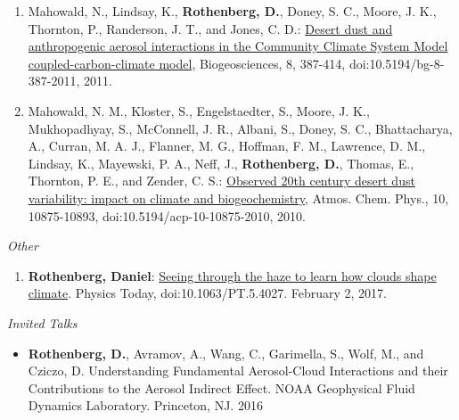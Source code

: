 \documentclass[11pt,letterpaper]{article}
\newcommand{\mhead}[1]{\leavevmode\marginpar{\sffamily\footnotesize #1}}
\begin{document}
\begin{enumerate}[itemindent=-10pt]
 \item Mahowald, N., Lindsay, K., \textbf{Rothenberg, D.}, Doney, S. C., Moore, J. K., Thornton, P., Randerson, J. T., and Jones, C. D.: \href{http://dx.doi.org/10.5194/bg-8-387-2011}{Desert dust and anthropogenic aerosol interactions in the Community Climate System Model coupled-carbon-climate model}, Biogeosciences, 8, 387-414, doi:10.5194/bg-8-387-2011, 2011.

 \item Mahowald, N. M., Kloster, S., Engelstaedter, S., Moore, J. K., Mukhopadhyay, S., McConnell, J. R., Albani, S., Doney, S. C., Bhattacharya, A., Curran, M. A. J., Flanner, M. G., Hoffman, F. M., Lawrence, D. M., Lindsay, K., Mayewski, P. A., Neff, J., \textbf{Rothenberg, D.}, Thomas, E., Thornton, P. E., and Zender, C. S.: \href{http://dx.doi.org/10.5194/acp-10-10875-2010}{Observed 20th century desert dust variability: impact on climate and biogeochemistry}, Atmos. Chem. Phys., 10, 10875-10893, doi:10.5194/acp-10-10875-2010, 2010.
\end{enumerate}

\bigskip
\emph{Other}
\medskip
\begin{enumerate}[itemindent=-10pt]

\item \textbf{Rothenberg, Daniel}: \href{http://physicstoday.scitation.org/do/10.1063/PT.5.4027/full/}{Seeing through the haze to learn how clouds shape climate}. Physics Today, doi:10.1063/PT.5.4027. February 2, 2017.

\end{enumerate}


\bigskip
\mhead{Presentations \newline and \newline Talks}%

\emph{Invited Talks}
\medskip
\begin{itemize}[itemindent=-10pt]
\item \textbf{Rothenberg, D.}, Avramov, A., Wang, C., Garimella, S., Wolf, M., and Cziczo, D. Understanding Fundamental Aerosol-Cloud Interactions and their Contributions to the Aerosol Indirect Effect. NOAA Geophysical Fluid Dynamics Laboratory. Princeton, NJ. 2016
\end{itemize}
\end{document}
